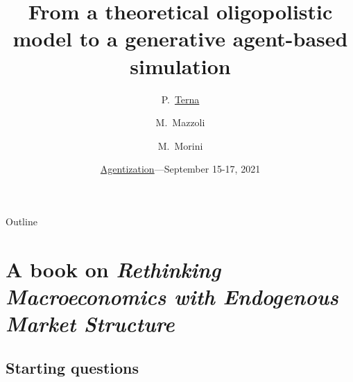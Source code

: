 \documentclass[9pt]{beamer}
\title [Oligopolistic ABM] %
{From a theoretical oligopolistic model to a generative agent-based simulation}
\author[] %
{P.~\href{https://terna.to.it}{Terna}\inst{1~2} \and M.~Mazzoli\inst{3} \and M.~Morini\inst{4~5}  }
\institute[] %
{
  \inst{1}%
 University of Torino, Italy
  \and
 \inst{2}%
  Fondazione Collegio Carlo Alberto, Honorary Fellow, Italy
 \and
  \inst{3}%
 University of Genova, Italy 
  \and
  \inst{4}%
  Credimi S.p.A., Milano, Italy
  \and
  \inst{5}%
 Ronin Institute, Montclair, New Jersey, US
  }
\date[] %
{\href{http://proteusfoundationseries.org/event/first-international-workshop-on-agentization-rendering-conventional-models-with-agent-based-computing/}{Agentization}---September 15-17, 2021}
\begin{document}
\noindent\makebox[\linewidth]{\rule{\paperwidth}{0.4pt}}

\begin{frame}

\titlepage

\end{frame}

\begin{frame}{Outline}

  \tableofcontents
\end{frame}

\section{A book on \emph{Rethinking Macroeconomics with Endogenous Market Structure}}

\subsection{Starting questions}
\end{document}
